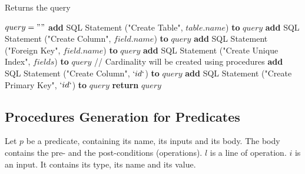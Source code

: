 \documentclass[oneside]{book}
\begin{document}
\begin{algorithm}
\caption{Returns the query}
\label{array-sum1}
\begin{algorithmic}[1]
	\State $query = ""$
		\State \textbf{add} SQL Statement ("Create Table", $table.name$) \textbf{to} $query$
			\State \textbf{add} SQL Statement ("Create Column", $field.name$) \textbf{to} $query$
			\State \textbf{add} SQL Statement ("Foreign Key", $field.name$) \textbf{to} $query$
			 \State \textbf{add} SQL Statement ("Create Unique Index", $fields$) \textbf{to} $query$
			\EndIf
			 \State // Cardinality will be created using procedures
			\EndIf
		\EndFor
		\State \textbf{add} SQL Statement ("Create Column", $`id`$) \textbf{to} $query$
		\State \textbf{add} SQL Statement ("Create Primary Key", $`id`$) \textbf{to} $query$
	\EndFor
			\State \textbf{return} $query$
\EndFunction
\end{algorithmic}
\end{algorithm}

\newpage

\subsection{Procedures Generation for Predicates}

Let $p$ be a predicate, containing its name, its inputs and its body. The body contains the pre- and the post-conditions (operations). $l$ is a line of operation. $i$ is an input. It contains its type, its name and its value.\\
\end{document}
